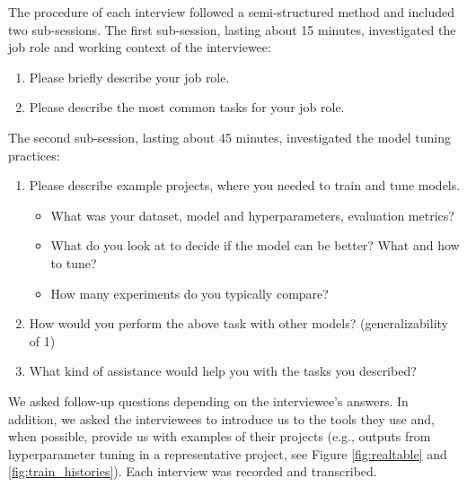 \documentclass[preprint]{vgtc}        %
\begin{document}
The procedure of each interview followed a semi-structured method and included two sub-sessions. The first sub-session, lasting about 15 minutes, investigated the job role and working context of the interviewee:
\begin{enumerate}
\item Please briefly describe your job role.
\item Please describe the most common tasks for your job role.
\end{enumerate}
The second sub-session, lasting about 45 minutes, investigated the model tuning practices:
\begin{enumerate}
\item Please describe example projects, where you needed to train and tune models.
\begin{itemize}
\item What was your dataset, model and hyperparameters, evaluation metrics?
\item What do you look at to decide if the model can be better? What and how to tune?
\item How many experiments do you typically compare?
\end{itemize}

\item How would you perform the above task with other models? (generalizability of 1)
\item What kind of assistance would help you with the tasks you described?
\end{enumerate}
We asked follow-up questions depending on the interviewee's answers. In addition, we asked the interviewees to introduce us to the tools they use and, when possible, provide us with examples of their projects (e.g., outputs from hyperparameter tuning in a representative project, see Figure \ref{fig:realtable} and \ref{fig:train_histories}). Each interview was recorded and transcribed. 
\end{document}
